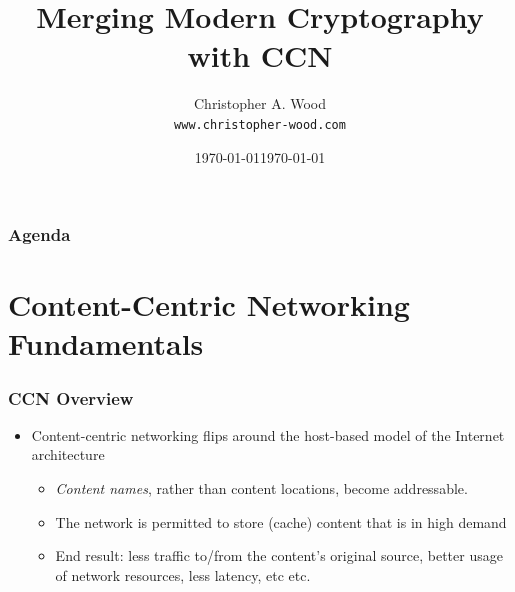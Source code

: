 \documentclass[handout]{beamer}
\title[Merging Modern Cryptography with CCN]{Merging Modern Cryptography with CCN}
\institute[RIT - UCI]{RIT - UCI}
\date{\today}
\author{Christopher A. Wood \\ {\tt www.christopher-wood.com}}
\date{\today}
\begin{document}

\begin{frame}
	\titlepage
\end{frame}

\begin{frame}
	\frametitle{Agenda}
	\tableofcontents
\end{frame}


\section{Content-Centric Networking Fundamentals}
\begin{frame}
	\frametitle{CCN Overview}
	\begin{itemize}
		\item Content-centric networking flips around the host-based model of the Internet architecture
		\begin{itemize}
			\item \emph{Content names}, rather than content locations, become addressable. 
			\item The network is permitted to store (cache) content that is in high demand
			\item End result: less traffic to/from the content's original source, better usage of network resources, less latency, etc etc.
		\end{itemize}
	\end{itemize}
\end{frame}
\end{document}
